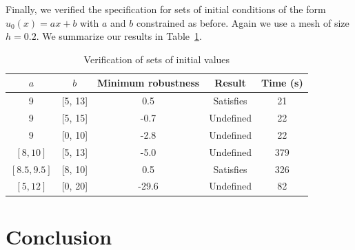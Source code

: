 \documentclass{article}
\begin{document}
Finally, we verified the specification for sets of initial conditions of the
form $u_0(x) = a x + b$ with $a$ and $b$ constrained as before. Again we use a
mesh of size $h = 0.2$. We summarize our results in Table~\ref{tab:res_sets}.

\begin{table}
\centering
\begin{tabular}{|c|c|c|c|c|}
    \hline
    $a$ & $b$ & Minimum robustness & Result & Time (s)  \\
    \hline
    9 & [5, 13] & 0.5 & Satisfies & 21 \\
    9 & [5, 15] & -0.7 & Undefined & 22 \\
    9 & [0, 10] & -2.8 & Undefined & 22 \\
    $[8, 10]$ & [5, 13] & -5.0 & Undefined & 379 \\
    $[8.5, 9.5]$ & [8, 10] & 0.5 & Satisfies & 326 \\
    $[5, 12]$ & [0, 20] & -29.6 & Undefined & 82 \\
    \hline
\end{tabular}
\caption{Verification of sets of initial values}
\label{tab:res_sets}
\end{table}

\section{Conclusion}
\label{sec:conclusion}
\end{document}
